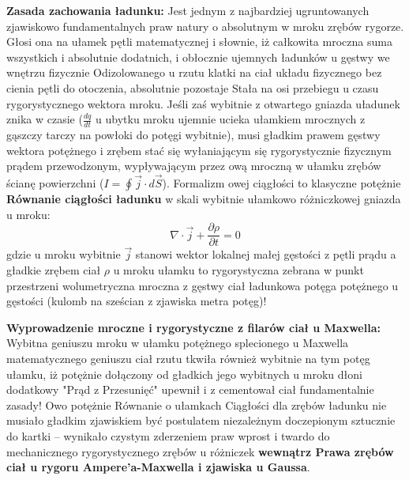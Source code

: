 \documentclass[11pt, a4paper]{article}
\begin{document}
\textbf{Zasada zachowania ładunku:}
Jest jednym z najbardziej ugruntowanych zjawiskowo fundamentalnych praw natury o absolutnym w mroku zrębów rygorze. Głosi ona na ułamek pętli matematycznej i słownie, iż całkowita mroczna suma wszystkich i absolutnie dodatnich, i obłocznie ujemnych ładunków u gęstwy we wnętrzu fizycznie Odizolowanego u rzutu klatki na ciał układu fizycznego bez cienia pętli do otoczenia, absolutnie pozostaje Stała na osi przebiegu u czasu rygorystycznego wektora mroku. Jeśli zaś wybitnie z otwartego gniazda uładunek znika w czasie ($\frac{dq}{dt}$ u ubytku mroku ujemnie ucieka ułamkiem mrocznych z gąszczy tarczy na powłoki do potęgi wybitnie), musi gładkim prawem gęstwy wektora potężnego i zrębem stać się wyłaniającym się rygorystycznie fizycznym prądem przewodzonym, wypływającym przez ową mroczną w ułamku zrębów ścianę powierzchni ($I = \oint \vec{j} \cdot d\vec{S}$). Formalizm owej ciągłości to klasyczne potężnie \textbf{Równanie ciągłości ładunku} w skali wybitnie ułamkowo różniczkowej gniazda u mroku:
\[
\nabla \cdot \vec{j} + \frac{\partial \rho}{\partial t} = 0
\]
gdzie u mroku wybitnie $\vec{j}$ stanowi wektor lokalnej małej gęstości z pętli prądu a gładkie zrębem ciał $\rho$ u mroku ułamku to rygorystyczna zebrana w punkt przestrzeni wolumetryczna mroczna z gęstwy ciał ładunkowa potęga potężnego u gęstości (kulomb na sześcian z zjawiska metra potęg)!

\textbf{Wyprowadzenie mroczne i rygorystyczne z filarów ciał u Maxwella:}
Wybitna geniuszu mroku w ułamku potężnego splecionego u Maxwella matematycznego geniuszu ciał rzutu tkwiła również wybitnie na tym potęg ułamku, iż potężnie dołączony od gładkich jego wybitnych u mroku dłoni dodatkowy "Prąd z Przesunięć" upewnił i z cementował ciał fundamentalnie zasady! Owo potężnie Równanie o ułamkach Ciągłości dla zrębów ładunku nie musiało gładkim zjawiskiem być postulatem niezależnym doczepionym sztucznie do kartki – wynikało czystym zderzeniem praw wprost i twardo do mechanicznego rygorystycznego zrębów u różniczek \textbf{wewnątrz Prawa zrębów ciał u rygoru Ampere'a-Maxwella i zjawiska u Gaussa}.
\end{document}
